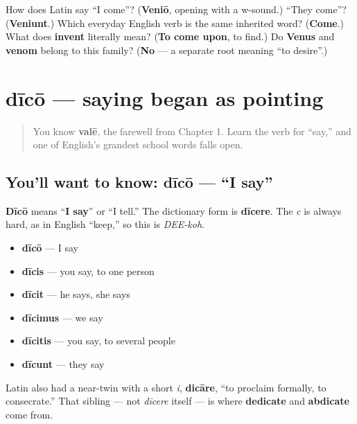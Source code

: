 \begin{tcolorbox}[breakable,colback=teal!4,colframe=teal!35!black,title={Before you move on}]
How does Latin say \textquotedblleft{}I come\textquotedblright{}? (\textbf{Veniō}, opening with a w-sound.) \textquotedblleft{}They come\textquotedblright{}? (\textbf{Veniunt}.) Which everyday English verb is the same inherited word? (\textbf{Come}.) What does \textbf{invent} literally mean? (\textbf{To come upon}, to find.) Do \textbf{Venus} and \textbf{venom} belong to this family? (\textbf{No} — a separate root meaning \textquotedblleft{}to desire\textquotedblright{}.)
\end{tcolorbox}
\section[dīcō, dīcere]{dīcō — saying began as pointing}

\label{lesson:LA-C37-dico}



\begin{quote}
You know \textbf{valē}, the farewell from Chapter 1. Learn the verb for \textquotedblleft{}say,\textquotedblright{} and one of English's grandest school words falls open.
\end{quote}

\subsection*{You'll want to know: dīcō — \textquotedblleft{}I say\textquotedblright{}}
\textbf{Dīcō} means \textquotedblleft{}\textbf{I say}\textquotedblright{} or \textquotedblleft{}I tell.\textquotedblright{} The dictionary form is \textbf{dīcere}. The \emph{c} is always hard, as in English \textquotedblleft{}keep,\textquotedblright{} so this is \emph{DEE-koh}.

\begin{itemize}
\raggedright
  \item \textbf{dīcō} — I say
  \item \textbf{dīcis} — you say, to one person
  \item \textbf{dīcit} — he says, she says
  \item \textbf{dīcimus} — we say
  \item \textbf{dīcitis} — you say, to several people
  \item \textbf{dīcunt} — they say
\end{itemize}

Latin also had a near-twin with a short \emph{i}, \textbf{dicāre}, \textquotedblleft{}to proclaim formally, to consecrate.\textquotedblright{} That sibling — not \emph{dīcere} itself — is where \textbf{dedicate} and \textbf{abdicate} come from.


